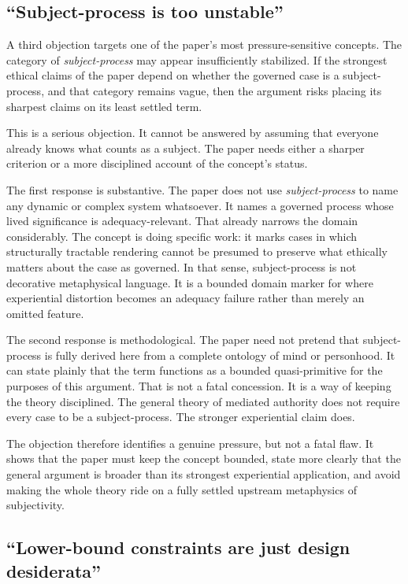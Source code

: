 \documentclass[11pt]{article}
\renewcommand{\emph}[1]{\textit{#1}}
\begin{document}
\subsection{``Subject-process is too unstable''}

A third objection targets one of the paper's most pressure-sensitive concepts. The category of \emph{subject-process} may appear insufficiently stabilized. If the strongest ethical claims of the paper depend on whether the governed case is a subject-process, and that category remains vague, then the argument risks placing its sharpest claims on its least settled term.

This is a serious objection. It cannot be answered by assuming that everyone already knows what counts as a subject. The paper needs either a sharper criterion or a more disciplined account of the concept's status.

The first response is substantive. The paper does not use \emph{subject-process} to name any dynamic or complex system whatsoever. It names a governed process whose lived significance is adequacy-relevant. That already narrows the domain considerably. The concept is doing specific work: it marks cases in which structurally tractable rendering cannot be presumed to preserve what ethically matters about the case as governed. In that sense, subject-process is not decorative metaphysical language. It is a bounded domain marker for where experiential distortion becomes an adequacy failure rather than merely an omitted feature.

The second response is methodological. The paper need not pretend that subject-process is fully derived here from a complete ontology of mind or personhood. It can state plainly that the term functions as a bounded quasi-primitive for the purposes of this argument. That is not a fatal concession. It is a way of keeping the theory disciplined. The general theory of mediated authority does not require every case to be a subject-process. The stronger experiential claim does.

The objection therefore identifies a genuine pressure, but not a fatal flaw. It shows that the paper must keep the concept bounded, state more clearly that the general argument is broader than its strongest experiential application, and avoid making the whole theory ride on a fully settled upstream metaphysics of subjectivity.

\subsection{``Lower-bound constraints are just design desiderata''}
\end{document}
